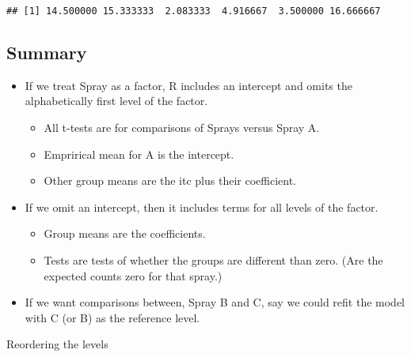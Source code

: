 \documentclass[12pt,openright,oneside,a4paper,chapter=TITLE,section=TITLE,subsection=Title,english,french,spanish,portugues,sumario=tradicional]{04-class-files/abntex2}
\newenvironment{Shaded}{\begin{snugshade}}{\end{snugshade}}
\newcommand{\DataTypeTok}[1]{\textcolor[rgb]{0.13,0.29,0.53}{#1}}
\newcommand{\KeywordTok}[1]{\textcolor[rgb]{0.13,0.29,0.53}{\textbf{#1}}}
\newcommand{\NormalTok}[1]{#1}
\newcommand{\OperatorTok}[1]{\textcolor[rgb]{0.81,0.36,0.00}{\textbf{#1}}}
\newcommand{\StringTok}[1]{\textcolor[rgb]{0.31,0.60,0.02}{#1}}
\providecommand{\tightlist}{%
  \setlength{\itemsep}{0pt}\setlength{\parskip}{0pt}}
\begin{document}
\begin{Shaded}
\end{Shaded}

\begin{verbatim}
## [1] 14.500000 15.333333  2.083333  4.916667  3.500000 16.666667
\end{verbatim}

\hypertarget{summary}{%
\subsection{Summary}\label{summary}}

\begin{itemize}
\tightlist
\item
  If we treat Spray as a factor, R includes an intercept and omits the alphabetically first level of the factor.

  \begin{itemize}
  \tightlist
  \item
    All t-tests are for comparisons of Sprays versus Spray A.
  \item
    Emprirical mean for A is the intercept.
  \item
    Other group means are the itc plus their coefficient.
  \end{itemize}
\item
  If we omit an intercept, then it includes terms for all levels of the factor.

  \begin{itemize}
  \tightlist
  \item
    Group means are the coefficients.
  \item
    Tests are tests of whether the groups are different than zero. (Are the expected counts zero for that spray.)
  \end{itemize}
\item
  If we want comparisons between, Spray B and C, say we could refit the model with C (or B) as the reference level.
\end{itemize}

Reordering the levels

\begin{Shaded}
\end{Shaded}
\end{document}
